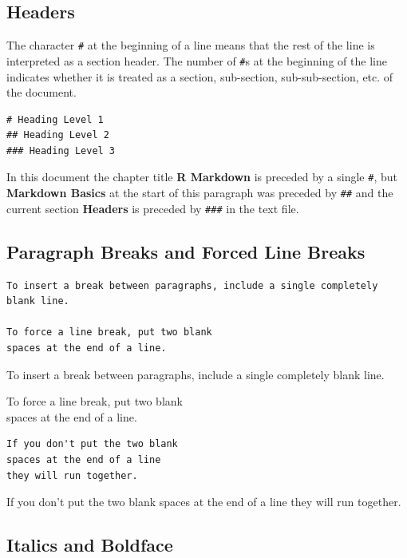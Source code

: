 \documentclass[]{book}
\begin{document}
\subsection{Headers}\label{headers}

The character \texttt{\#} at the beginning of a line means that the rest
of the line is interpreted as a section header. The number of
\texttt{\#}s at the beginning of the line indicates whether it is
treated as a section, sub-section, sub-sub-section, etc. of the
document.

\begin{verbatim}
# Heading Level 1  
## Heading Level 2  
### Heading Level 3
\end{verbatim}

In this document the chapter title \textbf{R Markdown} is preceded by a
single \texttt{\#}, but \textbf{Markdown Basics} at the start of this
paragraph was preceded by \texttt{\#\#} and the current section
\textbf{Headers} is preceded by \texttt{\#\#\#} in the text file.

\subsection{Paragraph Breaks and Forced Line
Breaks}\label{paragraph-breaks-and-forced-line-breaks}

\begin{verbatim}
To insert a break between paragraphs, include a single completely blank line.

To force a line break, put two blank  
spaces at the end of a line.
\end{verbatim}

To insert a break between paragraphs, include a single completely blank
line.

To force a line break, put two blank\\
spaces at the end of a line.

\begin{verbatim}
If you don't put the two blank
spaces at the end of a line
they will run together.
\end{verbatim}

If you don't put the two blank spaces at the end of a line they will run
together.

\subsection{Italics and Boldface}\label{italics-and-boldface}
\end{document}
